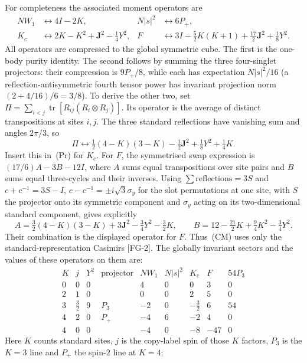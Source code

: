 For completeness the associated moment operators are
\[
 \begin{aligned}
 NW_1&\longleftrightarrow4I-2K,&
 N|s|^2&\longleftrightarrow6P_+,\\
 K_c&\longleftrightarrow 2K-K^2+\mathbf J^2-\tfrac14Y^2,&
 F&\longleftrightarrow3I-\tfrac52K(K+1)+\tfrac{17}2\mathbf J^2+\tfrac18Y^2.
 \end{aligned}\tag{CM}\label{eq:fqe-cubic-copy-moments}
\]
All operators are compressed to the global symmetric cube.
The first is the one-body purity identity. The second follows by summing
the three four-singlet projectors: their compression is $9P_+/8$, while
each has expectation $N|s|^2/16$ (a reflection-antisymmetric fourth
tensor power has invariant projection norm $(2+4/16)/6=3/8$).
To derive the other two, set $\Pi=\sum_{i<j}\operatorname{tr}[R_{ij}(R_i\otimes R_j)]$.
Its operator is the average of distinct transpositions at sites $i,j$.
The three standard reflections have vanishing sum and angles $2\pi/3$, so
\[
 \Pi\longleftrightarrow
 \tfrac12(4-K)(3-K)-\tfrac12\mathbf J^2+\tfrac18Y^2+\tfrac14K.
\]
Insert this in~(Pr) for $K_c$. For $F$, the symmetrised swap expression
is $(17/6)A-3B-12I$, where $A$ sums equal transpositions over site pairs
and $B$ sums equal three-cycles and their inverses. Using
$\sum\text{reflections}=3S$ and
$c+c^{-1}=3S-I$, $c-c^{-1}=\pm i\sqrt3\sigma_y$ for the slot permutations at one site, with
$S$ the projector onto its symmetric component and $\sigma_y$ acting on its two-dimensional standard component, gives explicitly
\[
 A=\tfrac32(4-K)(3-K)+3\mathbf J^2-\tfrac34Y^2-\tfrac32K,
 \qquad B=12-\tfrac{21}2K+\tfrac94K^2-\tfrac34Y^2.
\]
Their combination is the displayed operator for $F$.
Thus~(CM) uses only the standard-representation Casimirs [FG-2].
The globally invariant sectors and the values of these operators on them are:
\[
\begin{array}{cccc|ccccc}
 K & j & Y^2 & \text{projector} & NW_1 & N|s|^2 & K_c & F & 54P_3\\\hline
 0 & 0 & 0 & & 4 & 0 & 0 & 3 & 0\\
 2 & 1 & 0 & & 0 & 0 & 2 & 5 & 0\\
 3 & \tfrac32 & 9 & P_3 & -2 & 0 & -\tfrac32 & 6 & 54\\
 4 & 2 & 0 & P_+ & -4 & 6 & -2 & 4 & 0\\
 4 & 0 & 0 & & -4 & 0 & -8 & -47 & 0
\end{array}
\]
Here $K$ counts standard sites, $j$ is the copy-label spin of those $K$
factors, $P_3$ is the $K=3$ line and $P_+$ the spin-$2$ line at $K=4$;
